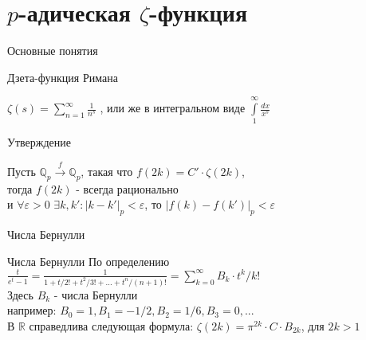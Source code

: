 \documentclass[newPxFont,sthlmFooter]{beamer}
\begin{document}
\section{$p$-адическая $\zeta$-функция}


\begin{frame}{Основные понятия}

\begin{exampleblock}{Дзета-функция Римана}
\begin{center}
$\zeta (s)=\sum \limits_{n=1}^{\infty }{\frac {1}{n^{s}}}$
, или же в интегральном виде $\int \limits_1^{\infty}\frac{dx}{x^s} $
\end{center}
\end{exampleblock}

\begin{alertblock}{Утверждение}
\begin{center}
 Пусть $ \mathbb{Q}_p{\stackrel {f}{\longrightarrow }}\mathbb{Q}_p$, такая что $f(2k) = C' \cdot \zeta(2k)$, \\ тогда $f(2k)$ - всегда рационально \\и $\forall \varepsilon > 0$ $ \exists k, k' : |k - k'|_p < \varepsilon$, то $|f(k) - f(k')|_p < \varepsilon$  
\end{center}
\end{alertblock}

\end{frame}{}

\begin{frame}{Числа Бернулли}
\begin{block}{Числа Бернулли}
По определению $\frac{t}{e^t-1} = \frac{1}{1+t/2!+t^2/3! +...+t^n/(n+1)!} = \sum \limits_{k=0}^{\infty}B_k\cdot t^k / k!$ \\ Здесь $B_k$ - числа Бернулли\\ например: $B_0 = 1, B_1 = -1/2, B_2 = 1/6, B_3 = 0, ...$
\\ В $\mathbb{R}$ справедлива следующая формула: $\zeta(2k) = \pi^{2k} \cdot C \cdot B_{2k}$, для $2k>1$
\end{block}
\end{frame}
\end{document}
